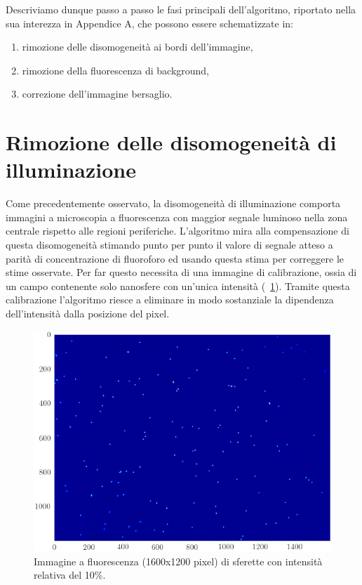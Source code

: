 Descriviamo dunque passo a passo le fasi principali dell'algoritmo, riportato nella sua interezza in Appendice A, che possono essere schematizzate in:
\begin{enumerate}
 \item rimozione delle disomogeneità ai bordi dell'immagine,
 \item rimozione della fluorescenza di background,
 \item correzione dell'immagine bersaglio.
\end{enumerate}


\section{Rimozione delle disomogeneità di illuminazione}

Come precedentemente osservato, la disomogeneità di illuminazione comporta immagini a microscopia a fluorescenza con maggior segnale luminoso nella zona centrale rispetto alle regioni periferiche.
L'algoritmo mira alla compensazione di questa disomogeneità stimando punto per punto il valore di segnale atteso a parità di concentrazione di fluoroforo ed usando questa stima per correggere le stime osservate.
Per far questo necessita di una immagine di calibrazione, ossia di un campo contenente solo nanosfere con un'unica intensità (\figurename~\ref{fig:unaint}).
Tramite questa calibrazione l'algoritmo riesce a eliminare in modo sostanziale la dipendenza dell'intensità dalla posizione del pixel. 

\begin{figure}
 \centering
 \includegraphics[scale=.64]{img/CAP3unaint.png}
 \caption{\small{Immagine a fluorescenza (1600x1200 pixel) di sferette con intensità relativa del 10\%.}}
 \label{fig:unaint}
\end{figure}

